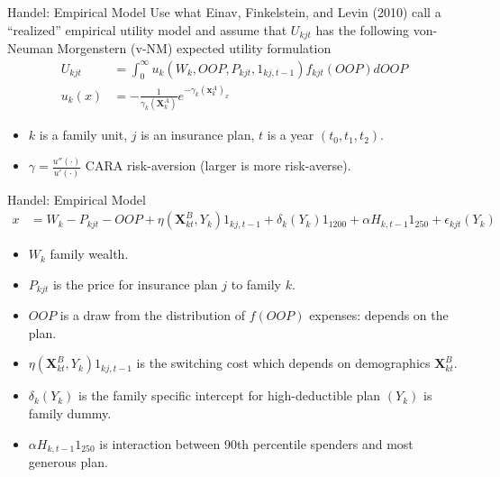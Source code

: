 \documentclass[xcolor=pdftex,dvipsnames,table,mathserif,aspectratio=169]{beamer}
\begin{document}
\begin{frame}{Handel: Empirical Model}
Use what Einav, Finkelstein, and Levin (2010) call a ``realized'' empirical utility model and assume that $U_{kjt}$ has the following von-Neuman Morgenstern (v-NM) expected utility formulation
\begin{align*}
U_{k j t}&=\int_{0}^{\infty}  u_{k}\left(W_{k}, O O P, P_{k j t}, 1_{k j, t-1}\right) f_{k j t}(O O P) d O O P\\
u_{k}(x)&=-\frac{1}{\gamma_{k}\left(\mathbf{X}_{k}^{A}\right)} e^{-\gamma_{k}\left(\mathbf{x}_{k}^{A}\right)_{x}}
\end{align*}
\begin{itemize}
\item $k$ is a family unit,  $j$ is an insurance plan,  $t$ is a year $(t_0,t_1,t_2)$.
\item $\gamma = \frac{u''(\cdot) }{u'(\cdot)}$ CARA risk-aversion (larger is more risk-averse).
\end{itemize}
\end{frame}


\begin{frame}{Handel: Empirical Model}
\begin{align*}
x &=W_{k}-P_{k j t}-O O P+\eta\left(\mathbf{X}_{k t}^{B}, Y_{k}\right) 1_{k j, t-1}+\delta_{k}\left(Y_{k}\right) 1_{1200}+\alpha H_{k, t-1} 1_{250}+\epsilon_{k j t}\left(Y_{k}\right)
\end{align*}
\begin{itemize}
\item $W_k$ family wealth.
\item $P_{k j t}$ is the price for insurance plan $j$ to family $k$.
\item $OOP$ is a draw from the distribution of $f(OOP)$ expenses: depends on the plan.
\item $\eta\left(\mathbf{X}_{k t}^{B}, Y_{k}\right) 1_{k j, t-1}$ is the switching cost which depends on demographics $\mathbf{X}_{k t}^{B}$.
\item $\delta_{k}(Y_k)$ is the family specific intercept for high-deductible plan $(Y_k)$ is family dummy.
\item $\alpha H_{k, t-1} 1_{250}$ is interaction between 90th percentile spenders and most generous plan.
\end{itemize}
\end{frame}
\end{document}

